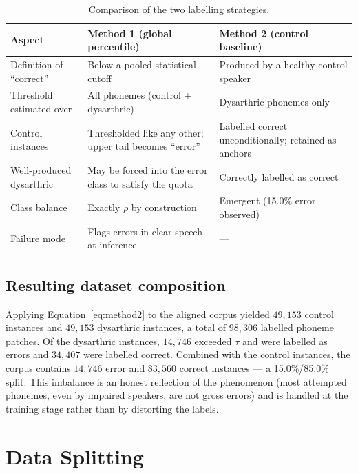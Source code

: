 \begin{table}[H]
\centering
\caption[Comparison of labelling strategies]{Comparison of the two labelling
strategies.}
\label{tab:labelling-comparison}
\small
\begin{tabularx}{\textwidth}{@{}p{4.1cm}XX@{}}
\toprule
\textbf{Aspect} & \textbf{Method 1 (global percentile)} & \textbf{Method 2 (control baseline)} \\
\midrule
Definition of ``correct'' & Below a pooled statistical cutoff & Produced by a healthy control speaker \\
Threshold estimated over  & All phonemes (control + dysarthric) & Dysarthric phonemes only \\
Control instances         & Thresholded like any other; upper tail becomes ``error'' & Labelled correct unconditionally; retained as anchors \\
Well-produced dysarthric  & May be forced into the error class to satisfy the quota & Correctly labelled as correct \\
Class balance             & Exactly $\rho$ by construction & Emergent (15.0\% error observed) \\
Failure mode              & Flags errors in clear speech at inference & --- \\
\bottomrule
\end{tabularx}
\end{table}

\subsection{Resulting dataset composition}

Applying Equation~\eqref{eq:method2} to the aligned corpus yielded
$49{,}153$ control instances and $49{,}153$ dysarthric instances, a total of
$98{,}306$ labelled phoneme patches. Of the dysarthric instances, $14{,}746$
exceeded $\tau$ and were labelled as errors and $34{,}407$ were labelled
correct. Combined with the control instances, the corpus contains $14{,}746$
error and $83{,}560$ correct instances --- a 15.0\%/85.0\% split. This imbalance
is an honest reflection of the phenomenon (most attempted phonemes, even by
impaired speakers, are not gross errors) and is handled at the training stage
rather than by distorting the labels.

\section{Data Splitting}
\label{sec:split}

